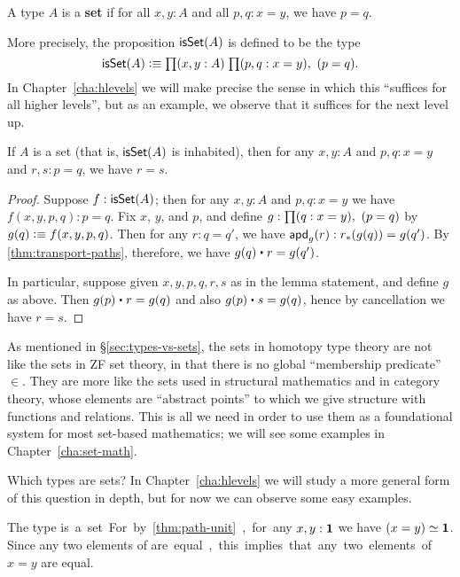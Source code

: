 \begin{defn}\label{defn:set}
  A type $A$ is a \textbf{set} if for all $x,y:A$ and all $p,q:x=y$, we have $p=q$.
\end{defn}

More precisely, the proposition $\mathsf{isSet}(A)$ is defined to be the type
\[ \isset(A) \defeq \prd{x,y:A}{p,q:x=y} (p=q). \]
In Chapter~\ref{cha:hlevels} we will make precise the sense in which this ``suffices for all higher levels'', but as an example, we observe that it suffices for the next level up.

\begin{lem}\label{thm:isset-is1type}
  If $A$ is a set (that is, $\mathsf{isSet}(A)$ is inhabited), then for any $x,y:A$ and $p,q:x=y$ and $r,s:p=q$, we have $r=s$.
\end{lem}
\begin{proof}
  Suppose $f:\mathsf{isSet}(A)$; then for any $x,y:A$ and $p,q:x=y$ we have $f(x,y,p,q):p=q$.
  Fix $x$, $y$, and $p$, and define $g: \prd{q:x=y} (p=q)$ by $g(q) \vcentcolon\equiv f (x,y,p,q)$.
  Then for any $r:q=q'$, we have $\mathsf{apd}_{g}(r) : {r}_{*}\!\left({g(q)}\right) = g(q')$.
  By \autoref{thm:transport-paths}, therefore, we have $g(q) \ct r = g(q')$.

  In particular, suppose given $x,y,p,q,r,s$ as in the lemma statement, and define $g$ as above.
  Then $g(p) \ct r = g(q)$ and also $g(p) \ct s = g(q)$, hence by cancellation we have $r=s$.
\end{proof}

As mentioned in \S\ref{sec:types-vs-sets},
the sets in homotopy type theory are not like the sets in ZF set theory, in that there is no global ``membership predicate'' $\in$.
They are more like the sets used in structural mathematics and in category theory, whose elements are ``abstract points'' to which we give structure with functions and relations.
This is all we need in order to use them as a foundational system for most set-based mathematics; we will see some examples in Chapter~\ref{cha:set-math}.

Which types are sets?
In Chapter~\ref{cha:hlevels} we will study a more general form of this question in depth, but for now we can observe some easy examples.

\begin{eg}
  The type \unit is a set.
  For by \autoref{thm:path-unit}, for any $x,y:\mathbf{1}$ we have $(x=y) \simeq \mathbf{1}$.
  Since any two elements of \unit are equal, this implies that any two elements of $x=y$ are equal.
\end{eg}

